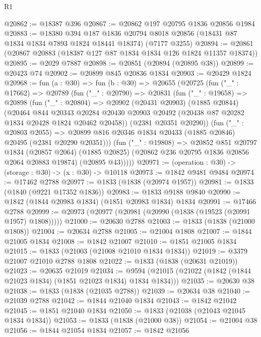 \begin{lexlean}{R1}
\begin{coremodule}
@20862 := @18387 @396
@20867 := @20862 @197 @20795 @1836 @20856 @1984
@20883 := @18380
    @394
    @187
    @1836
    @20794
    @8018
    @20856
    (@18431 @87 @1834 @1834 @7893 @1824 @18441 @18374)
    (@7177 @3255)
@20894 := @20861 (@20867 @20883 (@18387 @127 @87 @1834 @1834 @126 @1824 @11357 @18374))
@20895 := @2029 @7887
@20898 := @20851 (@20894 (@20895 @38))
@20899 := @20423 @74
@20902 := @20899 @845 @20836 @1834
@20903 := @20429 @1824
@20968 := fun (a : @30) =>
  fun (b : @30) =>
  @20655
    (@20725
      (fun ("_" : @17662) =>
      @20789
        (fun ("_" : @20790) =>
        @20831
          (fun ("_" : @19658) =>
          @20898
            (fun ("_" : @20804) =>
            @20902
              (@20431 @20903)
              (@1885 @20844)
              (@20464
                @844
                @20343
                @20284
                @20430
                @20903
                @20492
                (@20438 @87 @20282 @1834 @20428 @1824 @20462 @20458))
              (@2381 @20351 @20290))
            (fun ("_" : @20803 @2055) =>
            @20899 @816 @20346 @1834 @20433 (@1885 @20846) @20495 (@2381 @20290 @20351)))
          (fun ("_" : @19808) =>
          @20852
            @851
            @20797
            @1834
            (@20857 @2064)
            (@1885 @20825)
            (@20862 @236 @20795 @1836 @20856 @2064 @20883 @19874)
            (@20895 @43)))))
@20971 := (operation : @30) -> (storage : @30) -> (x : @30) -> @10118
@20973 := @1842 @9481 @9484
@20974 := @17462 @2788
@20977 := @1833 (@1838 (@20974 @1957))
@20981 := @1833 (@1840 (@9221 @17352 @1836))
@20983 := @1833 @9188 @9840
@20990 := @1842 (@1844 @20983 @1834) (@1851 @20983 @1834) @1834
@20991 := @17466 @2788
@20999 := @20973 (@20977 (@20981 (@20990 (@1838 (@19523 (@20991 @1957) @1808)))))
@21000 := @20630 @2788
@21003 := @1833 (@1838 (@21000 @1808))
@21004 := @20634 @2788
@21005 := @21004 @1808
@21007 := @1844 @21005 @1834
@21008 := @1842 @21007
@21010 := @1851 @21005 @1834
@21015 := @1833 (@21003 (@21008 @21010 @1834 @1834))
@21019 := @3379 @21007 @21010 @2788 @1808
@21022 := @1833 (@1838 (@20631 @21019))
@21023 := @20635 @21019
@21034 := @9594 (@21015 (@21022 (@1842 (@1844 @21023 @1834) (@1851 @21023 @1834) @1834 @1834)))
@21035 := @20630 @38
@21038 := @1833 (@1838 (@21035 @2788))
@21039 := @20634 @38
@21040 := @21039 @2788
@21042 := @1844 @21040 @1834
@21043 := @1842 @21042
@21045 := @1851 @21040 @1834
@21050 := @1833 (@21038 (@21043 @21045 @1834 @1834))
@21053 := @1833 (@1838 (@21000 @38))
@21054 := @21004 @38
@21056 := @1844 @21054 @1834
@21057 := @1842 @21056

\end{coremodule}
\end{lexlean}
